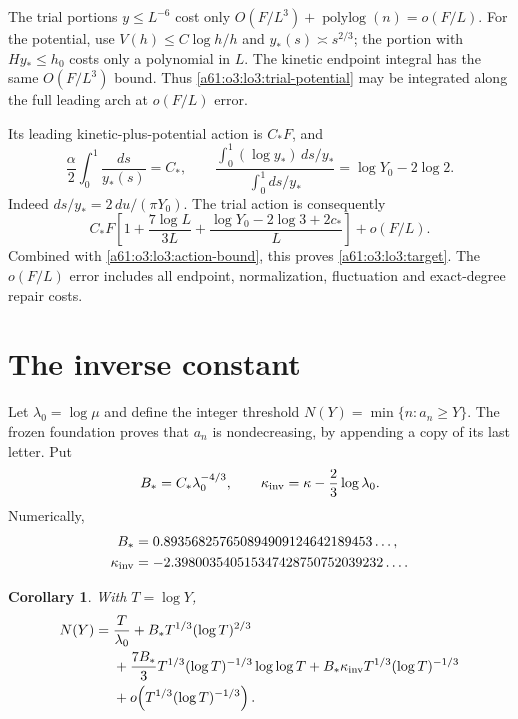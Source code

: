 \documentclass[11pt,letterpaper]{article}
\numberwithin{equation}{section}
\newtheorem{corollary}[theorem]{Corollary}
\theoremstyle{remark}\newtheorem{remark}[theorem]{Remark}
\begin{document}
The trial portions $y\le L^{-6}$ cost only
$O(F/L^3)+\operatorname{polylog}(n)=o(F/L)$.
For the potential, use $V(h)\le C\log h/h$ and
$y_*(s)\asymp s^{2/3}$; the portion with $Hy_*\le h_0$ costs only
a polynomial in $L$. The kinetic endpoint integral has the same
$O(F/L^3)$ bound. Thus \eqref{a61:o3:lo3:trial-potential} may be integrated
along the full leading arch at $o(F/L)$ error.

Its leading kinetic-plus-potential action is $C_*F$, and
\[
 \frac\alpha2\int_0^1\frac{ds}{y_*(s)}=C_*,\qquad
 \frac{\int_0^1(\log y_*)\,ds/y_*}
      {\int_0^1ds/y_*}=\log Y_0-2\log2.
\]
Indeed $ds/y_*=2\,du/(\pi Y_0)$. The trial action is consequently
\[
 C_*F\left[1+\frac{7\log L}{3L}
       +\frac{\log Y_0-2\log3+2c_*}{L}\right]+o(F/L).
\]
Combined with \eqref{a61:o3:lo3:action-bound}, this proves
\eqref{a61:o3:lo3:target}. The $o(F/L)$ error includes all endpoint,
normalization, fluctuation and exact-degree repair costs.

\section{The inverse constant}
\label{a61:o3:inv3:section}

Let $\lambda_0=\log\mu$ and define the integer threshold
$N(Y)=\min\{n:a_n\ge Y\}$. The frozen foundation proves that $a_n$
is nondecreasing, by appending a copy of its last letter.
Put
\[
 B_*=C_*\lambda_0^{-4/3},\qquad
 \kappa_{\rm inv}=\kappa-\frac23\log\lambda_0.
\]
Numerically,
\begin{align*}
 B_*&=0.893568257650894909124642189453\ldots,\\
 \kappa_{\rm inv}&=-2.398003540515347428750752039232\ldots.
\end{align*}

\begin{corollary}\label{a61:o3:inv3:theorem}
With $T=\log Y$,
\begin{align}
 N(Y)={}&\frac{T}{\lambda_0}
 +B_*T^{1/3}(\log T)^{2/3}\notag\\
 &+\frac{7B_*}{3}T^{1/3}(\log T)^{-1/3}\log\log T
 +B_*\kappa_{\rm inv}T^{1/3}(\log T)^{-1/3}\notag\\
 &+o\!\left(T^{1/3}(\log T)^{-1/3}\right).
 \label{a61:o3:inv3:expansion}
\end{align}
\end{corollary}
\end{document}
